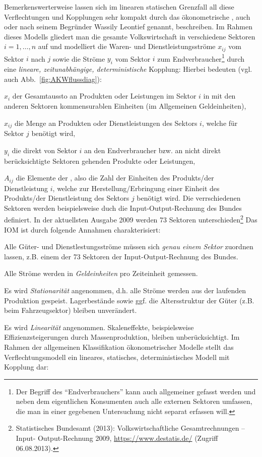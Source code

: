 Bemerkenswerterweise lassen sich im linearen statischen Grenzfall all
diese Verflechtungen und Kopplungen sehr kompakt durch 
das \"okonometrische , auch
 oder nach seinem Begr\"under
Wassily Leontief 
genannt, beschreiben. Im Rahmen dieses Modells gliedert man die gesamte
Volkswirtschaft in verschiedene Sektoren $i =1, \ldots, n$ auf und
modelliert die Waren- und Dienstleistungsstr\"ome $x_{ij}$ vom
Sektor $i$ nach $j$ sowie die Str\"ome $y_i$ vom Sektor $i$ zum
Endverbraucher\footnote{Der Begriff des ``Endverbrauchers'' kann auch allgemeiner gefasst werden und neben dem
eigentlichen Konsumenten auch alle externen Sektoren umfassen, die man in einer
gegebenen Untersuchung nicht separat erfassen will.}
 durch eine \textit{lineare,
zeitunabh\"angige, deterministische}  Kopplung:
Hierbei bedeuten (vgl. auch Abb.~\ref{fig:AKWflussdiag}):
\bi
\item $x_i$ der Gesamtaussto\3 an Produkten oder Leistungen im Sektor
$i$ in mit den anderen Sektoren kommensurablen Einheiten (im Allgemeinen Geldeinheiten),
\item $x_{ij}$ die Menge an Produkten oder Dienstleistungen
des Sektors $i$, welche f\"ur Sektor
$j$ be\-n\"o\-tigt wird,
\item $y_i$ die direkt von Sektor $i$ an den Endverbraucher bzw. an
nicht direkt ber\"ucksichtigte Sektoren gehenden
Produkte oder Leistungen,
\item $A_{ij}$ die Elemente  der  , also die Zahl der Einheiten des Produkts/der Dienstleistung $i$, welche
  zur Herstellung/Erbringung einer Einheit des Produkts/der
  Dienstleistung des Sektors $j$ ben\"o\-tigt wird.
\ei
%
Die verrschiedenen Sektoren werden beispielsweise duch
die Input-Output-Rechnung des Bundes definiert. In der aktuellsten Ausgabe 2009 werden
73 Sektoren unterschieden\footnote{Statistisches Bundesamt (2013):
  Volkswirtschaftliche Gesamtrechnungen -- Input-
Output-Rechnung 2009, \url{https://www.destatis.de/} (Zugriff 06.08.2013).}
Das IOM ist durch folgende Annahmen charakterisiert:
\bi
\item Alle G\"uter- und Dienstlestungsstr\"ome  m\"ussen sich \emph{genau
  einem Sektor} zuordnen lassen, z.B. einem der 73 Sektoren der
  Input-Output-Rechnung des Bundes.
\item Alle Str\"ome werden in \emph{Geldeinheiten} pro Zeiteinheit gemessen.
\item Es wird \emph{Stationarit\"at} angenommen, d.h. alle Str\"ome werden
  aus der laufenden Produktion gespeist. Lagerbest\"ande sowie ggf. die
  Altersstruktur der G\"uter (z.B. beim Fahrzeugsektor) bleiben
  unver\"andert.
\item Es wird \emph{Linearit\"at} angenommen. Skaleneffekte,
  beispielsweise Effizienzsteigerungen durch Massenproduktion, bleiben unber\"ucksichtigt.
\ei
%
Im Rahmen der allgemeinen Klassifikation \"okonometrischer Modelle
stellt das Verflechtungsmodell ein lineares, statisches,
deterministisches Modell mit Kopplung dar:


